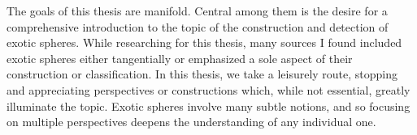 The goals of this thesis are manifold. Central among them is the desire for a comprehensive introduction to the topic of the construction and detection of exotic spheres. While researching for this thesis, many sources I found included exotic spheres either tangentially or emphasized a sole aspect of their construction or classification. In this thesis, we take a leisurely route, stopping and appreciating perspectives or constructions which, while not essential, greatly illuminate the topic. Exotic spheres involve many subtle notions, and so focusing on multiple perspectives deepens the understanding of any individual one. 
%


%
